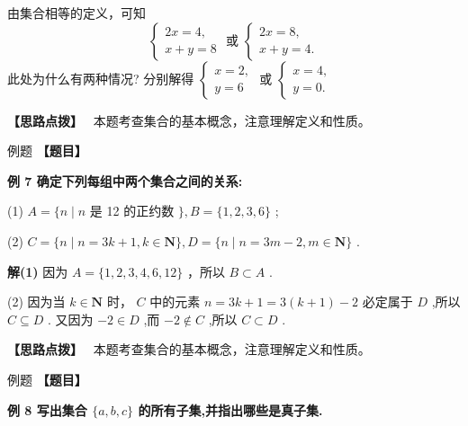 \documentclass[a4paper,10pt,oneside,fontset=none]{ctexbook}
\newcounter{example}[chapter]
\newenvironment{example}[1][]{\begin{exBox}{例题}{#1}}{\end{exBox}}
\numberwithin{equation}{chapter}
\newenvironment{solution}{\begin{solutionBox}}{\end{solutionBox}}
\newenvironment{hint}{\begin{hintBox}\textbf{【思路点拨】}~}{\end{hintBox}}
\begin{document}
\begin{solution}
由集合相等的定义，可知
$$
\left\{  {\begin{array}{l} {2x} = 4, \\  x + y = 8 \end{array}\text{ 或 }\left\{  \begin{array}{l} {2x} = 8, \\  x + y = 4. \end{array}\right. }\right.
$$
此处为什么有两种情况?
分别解得 $\left\{  \begin{array}{l} x = 2, \\  y = 6 \end{array}\right.$ 或 $\left\{  \begin{array}{l} x = 4, \\  y = 0. \end{array}\right.$
\end{solution}

\begin{hint}
本题考查集合的基本概念，注意理解定义和性质。
\end{hint}

\begin{example}
\textbf{【题目】}\par\vspace{0.3em}
\textbf{例 7 确定下列每组中两个集合之间的关系:}\par\vspace{0.3em}
\par
(1)  $A = \{ n \mid  n$ 是 12 的正约数 $\} , B = \{ 1,2,3,6\}$ ;
\par
(2)  $C = \{ n \mid  n = {3k} + 1, k \in  \mathbf{N}\} , D = \{ n \mid  n = {3m} - 2, m \in  \mathbf{N}\}$ .
\end{example}

\begin{solution}
\textbf{解(1)} 因为 $A = \{ 1,2,3,4,6,{12}\}$ ，所以 $B \subset  A$ .
\par
(2) 因为当 $k \in  \mathbf{N}$ 时， $C$ 中的元素 $n = {{3k} + 1} = 3\left( {k + 1}\right)  - 2$ 必定属于 $D$ ,所以 $C \subseteq  D$ .
又因为 $- 2 \in  D$ ,而 $- 2 \notin  C$ ,所以 $C \subset  D$ .
\end{solution}

\begin{hint}
本题考查集合的基本概念，注意理解定义和性质。
\end{hint}

\begin{example}
\textbf{【题目】}\par\vspace{0.3em}
\textbf{例 8 写出集合 $\{ a, b, c\}$ 的所有子集,并指出哪些是真子集.}\par\vspace{0.3em}
\end{example}
\end{document}
